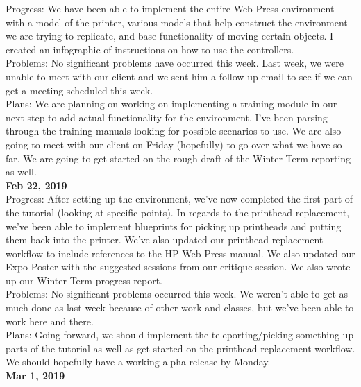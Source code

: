 Progress: 	We have been able to implement the entire Web Press environment with a model of the printer, various models that help construct the environment we are trying to replicate, and base functionality of moving certain objects. I created an infographic of instructions on how to use the controllers.  \\
Problems: 	No significant problems have occurred this week. Last week, we were unable to meet with our client and we sent him a follow-up email to see if we can get a meeting scheduled this week.\\
Plans: 	We are planning on working on implementing a training module in our next step to add actual functionality for the environment. I've been parsing through the training manuals looking for possible scenarios to use. We are also going to meet with our client on Friday (hopefully) to go over what we have so far. We are going to get started on the rough draft of the Winter Term reporting as well.\\
\textbf{Feb 22, 2019}\\
Progress: 	After setting up the environment, we've now completed the first part of the tutorial (looking at specific points). In regards to the printhead replacement, we've been able to implement blueprints for picking up printheads and putting them back into the printer. We've also updated our printhead replacement workflow to include references to the HP Web Press manual. We also updated our Expo Poster with the suggested sessions from our critique session. We also wrote up our Winter Term progress report. \\
Problems: 	No significant problems occurred this week. We weren't able to get as much done as last week because of other work and classes, but we've been able to work here and there. \\
Plans: 	Going forward, we should implement the teleporting/picking something up parts of the tutorial as well as get started on the printhead replacement workflow. We should hopefully have a working alpha release by Monday. 
\\
\textbf{Mar 1, 2019}\\

